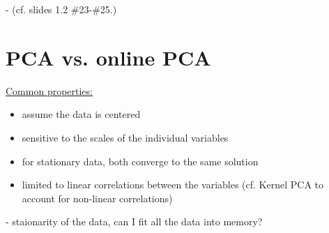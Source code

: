 

- (cf. slides 1.2 \#23-\#25.)

\section{PCA vs. online PCA}

\underline{Common properties:}

\begin{itemize}
\item assume the data is centered
\item sensitive to the scales of the individual variables
\item for stationary data, both converge to the same solution
\item limited to linear correlations between the variables (cf. Kernel PCA to account for non-linear correlations)
\end{itemize}


- staionarity of the data, can I fit all the data into memory?
